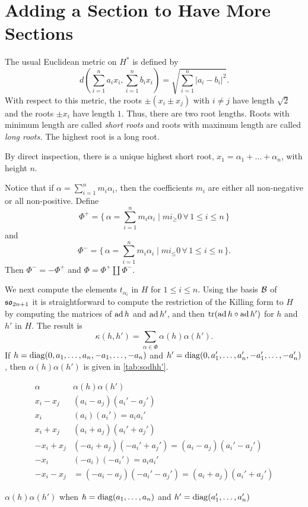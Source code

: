 \section{Adding a Section to Have More Sections}
The usual Euclidean metric on $H^*$ is defined by 
\[
d(\sum_{i=1}^n a_i x_i, \sum_{i=1}^n b_i x_i) = \sqrt{ \sum_{i=1}^n
  |a_i-b_i|^2}.
\]
With respect to this metric, the roots $\pm (x_i\pm x_j)$ with $i\ne j$ have
length $\sqrt 2$ and the roots $\pm x_i$ have length $1$. Thus, there are
two root lengths. Roots with minimum length are called \emph{short roots}
and roots with maximum length are called \emph{long roots.} The highest root
is a long root.

By direct inspection, there is a unique highest short root,
$x_1=\alpha_1+\dots +\alpha_n$, with height $n$.

Notice that if $\alpha=\sum_{i=1}^n m_i\alpha_i$, then the coefficients
$m_i$ are either all non-negative or all non-positive. Define
\[
\Phi^+=\Big\{\, \alpha=\sum_{i=1}^n m_i\alpha_i\mid mi_\geq 0 \, \forall\,
1\leq i\leq n\,\Big\}
\]
and
\[
\Phi^- = \Big\{\, \alpha=\sum_{i=1}^n m_i\alpha_i\mid mi_\leq 0 \, \forall\,
1\leq i\leq n\,\Big\}.
\]
Then $\Phi^-= -\Phi^+$ and $\Phi = \Phi^+ \coprod \Phi^-$.

We next compute the elements $t_{\alpha_i}$ in $H$ for $1\leq i\leq
n$. Using the basis ${\mathcal B}$ of $\mathfrak {so}_{2n+1}$ it is straightforward to compute
the restriction of the Killing form to $H$ by computing the matrices of $\operatorname{ad}
h$ and $\operatorname{ad} h'$, and then ${\operatorname{tr}}(\operatorname{ad} h\circ \operatorname{ad} h')$ for $h$ and $h'$ in
$H$. The result is
\[
\kappa(h,h')= \sum_{\alpha\in \Phi} \alpha(h) \alpha(h').
\]
If $h={\operatorname{diag}(0,a_1,\dots,a_n, -a_1,\dots,-a_n)}$ and $h'={\operatorname{diag}(0,a'_1,\dots,a'_n, -a'_1,\dots,-a'_n)}$, then
$\alpha(h) \alpha(h')$ is given in \cref{tab:sodhh'}.
\begin{table}[h!tb]
  \small {}
  \renewcommand{\arraystretch}{1.3}
  \begin{equation*}
    \begin{array}{c|c}
      \alpha&\alpha(h) \alpha(h')\\\hline
      x_i-x_j& (a_i-a_j)(a_i'-a_j')\\
      x_i&(a_i)(a_i')= a_ia_i'\\ 
      x_i+x_j&(a_i+a_j)(a_i'+a_j')\\ 
      - x_i+x_j&(-a_i+a_j)(-a_i'+a_j')=(a_i-a_j)(a_i'-a_j')\\
      -x_i &(-a_i)(-a_i')=a_ia_i'\\ 
      -x_i-x_j&=(-a_i-a_j)(-a_i'-a_j')=(a_i+a_j)(a_i'+a_j') 
    \end{array}  
  \end{equation*}
  \caption{$\alpha(h) \alpha(h')$ when $h={\operatorname{diag}(a_1,\dots,a_n)}$ and
    $h'={\operatorname{diag}(a'_1,\dots,a'_n)}$}\label{tab:sodhh'}  
\end{table}

